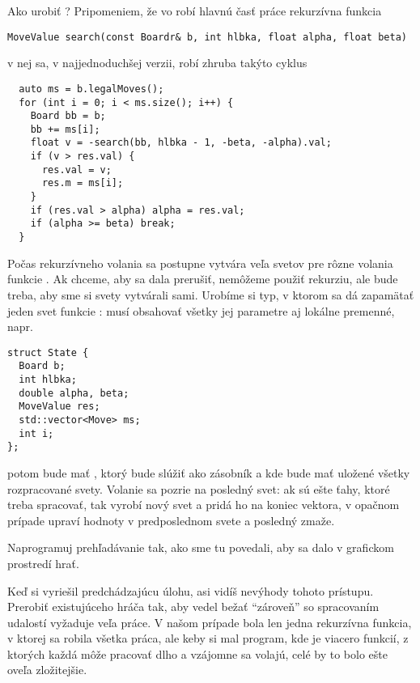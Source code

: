 Ako urobiť ? Pripomeniem, že vo  robí hlavnú časť práce rekurzívna funkcia 

\begin{lstlisting}
MoveValue search(const Boardr& b, int hlbka, float alpha, float beta)
\end{lstlisting}

v nej sa, v najjednoduchšej verzii, robí zhruba takýto cyklus

\begin{lstlisting}
  auto ms = b.legalMoves();
  for (int i = 0; i < ms.size(); i++) {
    Board bb = b;
    bb += ms[i];
    float v = -search(bb, hlbka - 1, -beta, -alpha).val;
    if (v > res.val) {
      res.val = v;
      res.m = ms[i];
    }
    if (res.val > alpha) alpha = res.val;
    if (alpha >= beta) break;
  }
\end{lstlisting}

Počas rekurzívneho volania sa postupne vytvára veľa svetov pre rôzne volania funkcie . Ak chceme, aby sa dala prerušiť, nemôžeme použiť
rekurziu, ale bude treba, aby sme si svety vytvárali sami. Urobíme si typ, v ktorom sa dá zapamätať jeden svet funkcie : musí obsahovať
všetky jej parametre aj lokálne premenné, napr.

\begin{lstlisting}
struct State {
  Board b;
  int hlbka;
  double alpha, beta;
  MoveValue res;
  std::vector<Move> ms;
  int i;
};
\end{lstlisting}

 potom bude mať , ktorý bude slúžiť ako zásobník a
kde bude mať uložené všetky rozpracované svety. Volanie  sa pozrie na posledný svet: ak sú ešte ťahy, ktoré treba 
spracovať, tak vyrobí nový svet a pridá ho na koniec vektora, v opačnom prípade upraví hodnoty v predposlednom svete a posledný zmaže.

\begin{uloha}
  Naprogramuj prehľadávanie tak, ako sme tu povedali, aby sa dalo v grafickom prostredí hrať.
\end{uloha}

Keď si vyriešil predchádzajúcu úlohu, asi vidíš nevýhody tohoto prístupu. Prerobiť existujúceho hráča tak, aby vedel 
bežať ``zároveň'' so spracovaním udalostí vyžaduje veľa práce. V našom prípade bola len jedna rekurzívna funkcia,
v ktorej sa robila všetka práca, ale
keby si mal program, kde je viacero funkcií, z ktorých každá môže pracovať dlho a vzájomne sa volajú, celé by to 
bolo ešte oveľa zložitejšie. 

